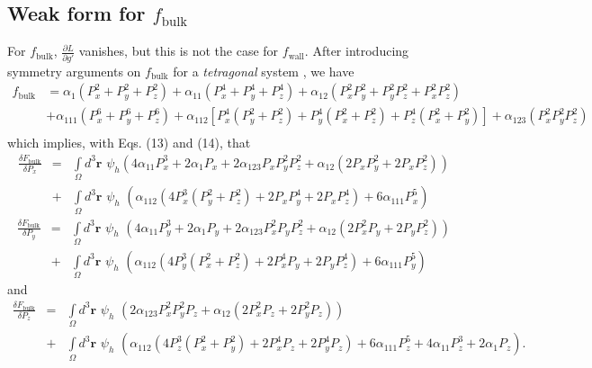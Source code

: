 \documentclass[16pt]{article} %
\begin{document}
\subsection{Weak form for $f_\mathrm{bulk}$}
%
For $f_\mathrm{bulk}$, $\frac{\partial L}{\partial g'}$ vanishes, but this is not the case for $f_\mathrm{wall}$.
%
After introducing symmetry arguments on $f_\mathrm{bulk}$ for a \emph{tetragonal} system \cite{Li2001, Cao2008}, we have
%
\begin{align}\tag{14}
f_\mathrm{bulk} &= \alpha_1 \left(P_x^2 + P_y^2 + P_z^2 \right) + \alpha_{11} \left(P_x^4 + P_y^4 + P_z^4 \right) + \alpha_{12} \left(P_x^2 P_y^2 + P_y^2 P_z^2 + P_x^2 P_z^2 \right) \\ \nonumber
&+ \alpha_{111} \left(P_x^6 + P_y^6 + P_z^6 \right) + \alpha_{112} \left[P_x^4 \left(P_y^2 + P_z^2 \right) + P_y^4 \left(P_x^2 + P_z^2 \right) + P_z^4 \left(P_x^2 + P_y^2 \right) \right] + \alpha_{123} \left(P_x^2 P_y^2 P_z^2 \right) \\ \nonumber
\end{align}
%
which implies, with Eqs. (13) and (14), that
%
\begin{eqnarray}\nonumber
\frac{ \delta F_\mathrm{bulk}}{\delta P_x} &=& \int\limits_\Omega d^3  \textbf{r} \,\,\psi_h \left(4 \alpha _{11} P_x^3+2 \alpha _1 P_x+2 \alpha _{123} P_x P_y^2 P_z^2+\alpha _{12} \left(2 P_x P_y^2+2 P_x P_z^2\right) \right)\\ \nonumber
&+&  \int\limits_\Omega d^3  \textbf{r} \,\,\psi_h \,\, \left(\alpha _{112} \left(4 P_x^3 \left(P_y^2+P_z^2\right)+2 P_x P_y^4+2 P_x P_z^4\right) + 6 \alpha _{111} P_x^5\right)
\end{eqnarray}
%
\begin{eqnarray}\nonumber
\frac{ \delta F_\mathrm{bulk}}{\delta P_y} &=& \int\limits_\Omega d^3  \textbf{r} \,\,\psi_h \,\, \left(4 \alpha _{11} P_y^3+2 \alpha _1 P_y +2 \alpha _{123} P_x^2 P_y P_z^2+\alpha _{12} \left(2 P_x^2 P_y+2 P_y P_z^2\right) \right) \\ \nonumber
&+&  \int\limits_\Omega d^3  \textbf{r} \,\,\psi_h \,\, \left(\alpha _{112} \left(4 P_y^3 \left(P_x^2+P_z^2\right)+2 P_x^4 P_y+2 P_y P_z^4\right)+6 \alpha _{111} P_y^5 \right)
\end{eqnarray}
%
and
%
\begin{eqnarray}\nonumber
\frac{ \delta F_\mathrm{bulk}}{\delta P_z} &=& \int\limits_\Omega d^3  \textbf{r} \,\,\psi_h \,\, \left(2 \alpha _{123} P_x^2 P_y^2 P_z+\alpha _{12} \left(2 P_x^2 P_z+2 P_y^2 P_z\right) \right) \\ \nonumber
&+& \int\limits_\Omega d^3  \textbf{r} \,\,\psi_h \,\,  \left(\alpha _{112} \left(4 P_z^3 \left(P_x^2+P_y^2\right)+2 P_x^4 P_z+2 P_y^4 P_z\right)+6 \alpha _{111} P_z^5+4 \alpha _{11} P_z^3+2 \alpha _1 P_z \right).
\end{eqnarray}
\end{document}
